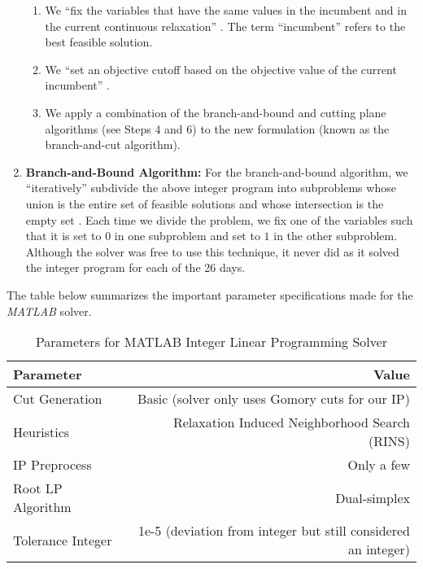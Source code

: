 \documentclass[11pt]{article}
\begin{document}
\begin{enumerate}
\begin{enumerate}
\item We ``fix the variables that have the same values in the incumbent and in the current continuous relaxation'' \cite{danna2005exploring}.  The term ``incumbent'' refers to the best feasible solution.

\item We ``set an objective cutoff based on the objective value of the current incumbent'' \cite{danna2005exploring}.

\item We apply a combination of the branch-and-bound and cutting plane algorithms (see Steps 4 and 6) to the new formulation (known as the branch-and-cut algorithm).  


\end{enumerate}




\item \textbf{Branch-and-Bound Algorithm:} For the branch-and-bound algorithm, we ``iteratively'' subdivide the above integer program into subproblems whose union is the entire set of feasible solutions and whose intersection is the empty set \cite{IP_textbook,LPOR_textbook}. Each time we divide the problem, we fix one of the variables such that it is set to $0$ in one subproblem and set to $1$ in the other subproblem.  Although the solver was free to use this technique, it never did as it solved the integer program for each of the 26 days. 


\end{enumerate}

\noindent The table below summarizes the important parameter specifications made for the \textit{MATLAB} solver. 

\begin{table}[H]
\centering
\begin{tabular}{l|r}
\hline
\textbf{Parameter} & \textbf{Value} \\\hline
Cut Generation & Basic (solver only uses Gomory cuts for our IP) \\ Heuristics & Relaxation Induced Neighborhood Search (RINS) \\ IP Preprocess & Only a few \\ 
Root LP Algorithm & Dual-simplex \\ 
Tolerance Integer & 1e-5 (deviation from integer but still considered an integer) \\
\hline
\end{tabular}
\caption{\label{tab:widgets}Parameters for MATLAB Integer Linear Programming Solver}
\end{table}
\end{document}
